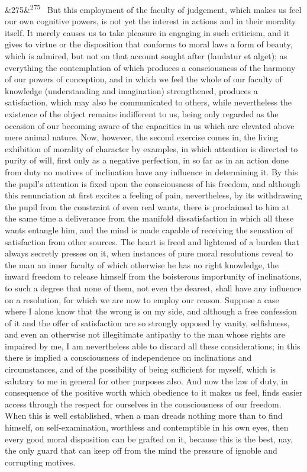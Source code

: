 \documentclass[12pt]{article}
\newcommand{\para}[1][]{\par\noindent\ifx&#1&\else\textsuperscript{\footnotesize #1}~\fi}
\begin{document}
\para[275] But this employment of the faculty of judgement, which makes us feel our own cognitive powers, is not yet the interest in actions and in their morality itself. It merely causes us to take pleasure in engaging in such criticism, and it gives to virtue or the disposition that conforms to moral laws a form of beauty, which is admired, but not on that account sought after (laudatur et alget); as everything the contemplation of which produces a consciousness of the harmony of our powers of conception, and in which we feel the whole of our faculty of knowledge (understanding and imagination) strengthened, produces a satisfaction, which may also be communicated to others, while nevertheless the existence of the object remains indifferent to us, being only regarded as the occasion of our becoming aware of the capacities in us which are elevated above mere animal nature. Now, however, the second exercise comes in, the living exhibition of morality of character by examples, in which attention is directed to purity of will, first only as a negative perfection, in so far as in an action done from duty no motives of inclination have any influence in determining it. By this the pupil's attention is fixed upon the consciousness of his freedom, and although this renunciation at first excites a feeling of pain, nevertheless, by its withdrawing the pupil from the constraint of even real wants, there is proclaimed to him at the same time a deliverance from the manifold dissatisfaction in which all these wants entangle him, and the mind is made capable of receiving the sensation of satisfaction from other sources. The heart is freed and lightened of a burden that always secretly presses on it, when instances of pure moral resolutions reveal to the man an inner faculty of which otherwise he has no right knowledge, the inward freedom to release himself from the boisterous importunity of inclinations, to such a degree that none of them, not even the dearest, shall have any influence on a resolution, for which we are now to employ our reason. Suppose a case where I alone know that the wrong is on my side, and although a free confession of it and the offer of satisfaction are so strongly opposed by vanity, selfishness, and even an otherwise not illegitimate antipathy to the man whose rights are impaired by me, I am nevertheless able to discard all these considerations; in this there is implied a consciousness of independence on inclinations and circumstances, and of the possibility of being sufficient for myself, which is salutary to me in general for other purposes also. And now the law of duty, in consequence of the positive worth which obedience to it makes us feel, finds easier access through the respect for ourselves in the consciousness of our freedom. When this is well established, when a man dreads nothing more than to find himself, on self-examination, worthless and contemptible in his own eyes, then every good moral disposition can be grafted on it, because this is the best, nay, the only guard that can keep off from the mind the pressure of ignoble and corrupting motives.
\end{document}
